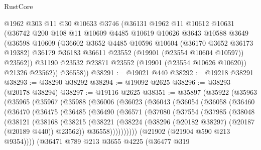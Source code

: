 \begin{lexlean}{RustCore}
\begin{coremodule}
        @1962
        @303
        @11
        @30
        @10633
        @3746
        (@36131
          @1962
          @11
          @10612
          @10631
          (@36742
            @200
            @108
            @11
            @10609
            @4485
            @10619
            @10626
            @3643
            @10588
            @3649
            (@36598
              @10609
              (@36602
                @3652
                @4485
                @10596
                @10604
                (@36170 @3652 @36173 @19382)
                @36179
                @36183
                @36611
                @23552
                (@19901 (@23554 @10604 @10597))
                @23562))
            @31190
            @23532
            @23871
            @23552
            (@19901 (@23554 @10626 @10620))
            @21326
            @23562))
        @36558))
@38291 := @19021 @440
@38292 := @19218 @38291
@38293 := @38290 @38292
@38294 := @19092 @2625
@38296 := @38293 (@20178 @38294)
@38297 := @19116 @2625
@38351 := @35897
    (@35922
      (@35963
        (@35965
          (@35967
            (@35988
              (@36006
                (@36023
                  (@36043
                    (@36054
                      (@36058
                        (@36460
                          (@36470
                            (@36475
                              (@36485
                                (@36490
                                  (@36571
                                    (@37080
                                      (@37554
                                        (@37985
                                          (@38048
                                            (@38121
                                              (@38168
                                                (@38215
                                                  (@38221
                                                    (@38224
                                                      (@38296
                                                        (@20182 @38297)
                                                        (@20187 (@20189 @440))
                                                        @23562))
                                                    @36558))))))))))
                                (@21902 (@21904 @590 @213 @9354))))
                            (@36471
                              @789
                              @213
                              @3655
                              @4225
                              (@36477
                                @319

\end{coremodule}
\end{lexlean}

